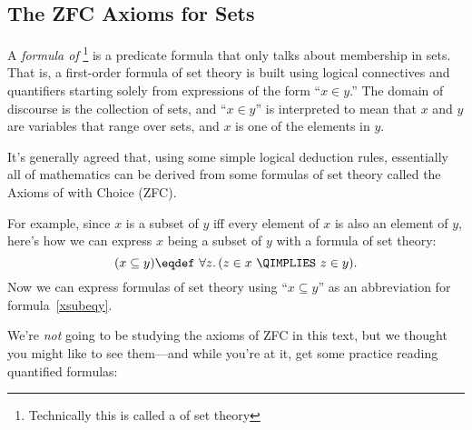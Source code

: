\subsection{The ZFC Axioms for Sets}\label{ZFC_sec}

A \emph{formula of }\footnote{Technically this is
  called a  of set theory} is a predicate
formula that only talks about membership in sets.  That is, a
first-order formula of set theory is built using logical connectives
and quantifiers starting solely from expressions of the form ``$x\in
y$.''  The domain of discourse is the collection of sets, and ``$x \in
y$'' is interpreted to mean that $x$ and $y$ are variables that range
over sets, and $x$ is one of the elements in $y$.

It's generally agreed that, using some simple logical deduction rules,
essentially all of mathematics can be derived from some formulas of
set theory called the Axioms of  with Choice (ZFC).%
%

For example, since $x$ is a subset of $y$ iff every element of $x$ is
also an element of $y$, here's how we can express $x$ being a subset
of $y$ with a formula of set theory:
\begin{equation}\label{xsubeqy}
(x \subseteq y) \eqdef\ \forall z.\, (z \in x\ \QIMPLIES\ z \in y).
\end{equation}
Now we can express formulas of set theory using ``$x \subseteq y$'' as
an abbreviation for formula~\eqref{xsubeqy}.

We're \emph{not} going to be studying the axioms of ZFC in this text,
but we thought you might like to see them---and while you're at it,
get some practice reading quantified formulas: 

